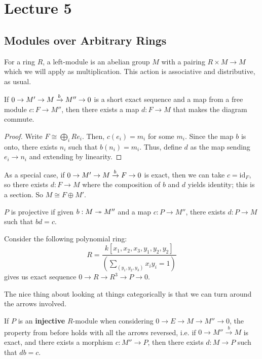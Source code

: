 \section{Lecture 5}
\subsection{Modules over Arbitrary Rings}
For a ring $R$, a left-module is an abelian group $M$ with a pairing $R \times M \to M$
which we will apply as multiplication.
This action is associative and distributive, as usual.
\begin{theorem}
    If $0 \to M' \to M \xrightarrow{b} M'' \to 0$ is a short exact sequence and a map from a free module $c: F \to M''$,
    then there exists a map $d : F \to M$ that makes the diagram commute.
    \begin{proof}
        Write $F \cong \bigoplus_i Re_i$. Then, $c(e_i) = m_i$ for some $m_i$.
        Since the map $b$ is onto, there exists $n_i$ such that $b(n_i) = m_i$. Thus,
        define $d$ as the map sending $e_i \to n_i$ and extending by linearity.
    \end{proof}
\end{theorem}
As a special case, if $0 \to M' \to M \xrightarrow{b} F \to 0$ is exact, then we can take $c = \text{id}_F$,
so there exists $d: F \to M$ where the composition of $b$ and $d$ yields identity; this is a section.
So $M \cong F \oplus M'$.

\begin{definition}
    $P$ is projective if given $b: M \twoheadrightarrow M''$
    and a map $c: P \to M''$,
    there exists $d: P \to M$ such that $bd = c$.
\end{definition}

\begin{example}
    Consider the following polynomial ring:
    \[ R = \frac{k[x_1, x_2, x_3, y_1, y_2, y_2]}{(\sum_{(y_1, y_2, y_3)} x_i y_i = 1)} \]
    gives us exact sequence $0 \to R \to R^3 \to P \to 0$.
\end{example}

The nice thing about looking at things categorically is that we can turn around the arrows involved.
    
If $P$ is an \textbf{injective} $R$-module when considering $0 \to E \to M \to M'' \to 0$,
the property from before holds with all the arrows reversed, i.e.
if $0 \to M'' \xrightarrow{b} M$ is exact, and there exists a morphism $c: M'' \to P$, then there exists $d: M \to P$
such that $db = c$.


